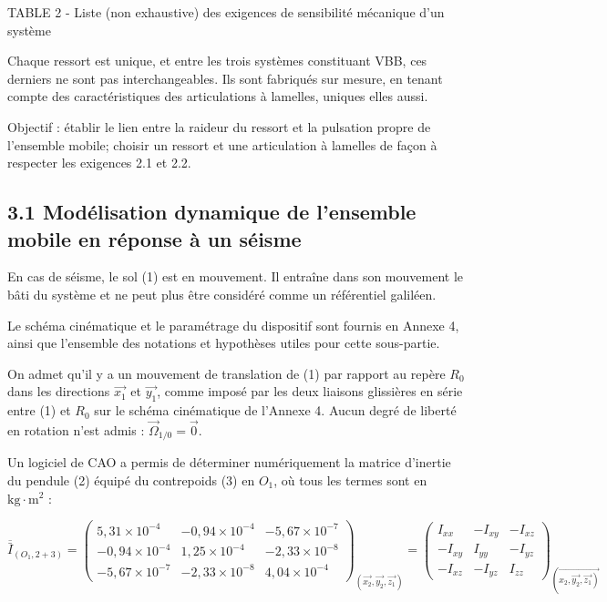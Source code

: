 \documentclass[10pt]{article}
\begin{document}
TABLE 2 - Liste (non exhaustive) des exigences de sensibilité mécanique d'un système

Chaque ressort est unique, et entre les trois systèmes constituant VBB, ces derniers ne sont pas interchangeables. Ils sont fabriqués sur mesure, en tenant compte des caractéristiques des articulations à lamelles, uniques elles aussi.

Objectif : établir le lien entre la raideur du ressort et la pulsation propre de l'ensemble mobile; choisir un ressort et une articulation à lamelles de façon à respecter les exigences 2.1 et 2.2.

\subsection*{3.1 Modélisation dynamique de l'ensemble mobile en réponse à un séisme}
En cas de séisme, le sol (1) est en mouvement. Il entraîne dans son mouvement le bâti du système et ne peut plus être considéré comme un référentiel galiléen.

Le schéma cinématique et le paramétrage du dispositif sont fournis en Annexe 4, ainsi que l'ensemble des notations et hypothèses utiles pour cette sous-partie.

On admet qu'il y a un mouvement de translation de (1) par rapport au repère $R_{0}$ dans les directions $\overrightarrow{x_{1}}$ et $\overrightarrow{y_{1}}$, comme imposé par les deux liaisons glissières en série entre (1) et $R_{0}$ sur le schéma cinématique de l'Annexe 4. Aucun degré de liberté en rotation n'est admis : $\vec{\Omega}_{1 / 0}=\overrightarrow{0}$.

Un logiciel de CAO a permis de déterminer numériquement la matrice d'inertie du pendule (2) équipé du contrepoids (3) en $O_{1}$, où tous les termes sont en $\mathrm{kg} \cdot \mathrm{m}^{2}$ :

$$
\overline{\bar{I}}_{\left(O_{1}, 2+3\right)}=\left(\begin{array}{ccc}
5,31 \times 10^{-4} & -0,94 \times 10^{-4} & -5,67 \times 10^{-7} \\
-0,94 \times 10^{-4} & 1,25 \times 10^{-4} & -2,33 \times 10^{-8} \\
-5,67 \times 10^{-7} & -2,33 \times 10^{-8} & 4,04 \times 10^{-4}
\end{array}\right)_{\left(\overrightarrow{x_{2}}, \overrightarrow{y_{2}}, \overrightarrow{z_{1}}\right)}=\left(\begin{array}{ccc}
I_{x x} & -I_{x y} & -I_{x z} \\
-I_{x y} & I_{y y} & -I_{y z} \\
-I_{x z} & -I_{y z} & I_{z z}
\end{array}\right)_{\left(\overrightarrow{\left.x_{2}, \overrightarrow{y_{2}}, \overrightarrow{z_{1}}\right)}\right.}
$$
\end{document}
